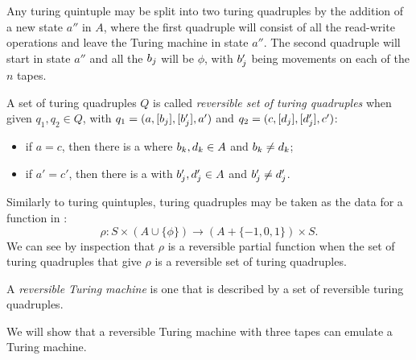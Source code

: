 \begin{remark}\label{rem:quintuple_to_quadruple}
  Any turing quintuple may be split into two
  turing quadruples by the addition of a new state $a''$ in $A$, where the
  first quadruple will consist of all the read-write operations and
  leave the Turing machine in state $a''$. The second quadruple will start
  in state $a''$ and all the $b_j$ will be $\phi$, with $b'_j$ being
  movements on each of the $n$ tapes.
\end{remark}

\begin{definition}\label{def:reversible_turing_quadruple}
  A set of turing quadruples $Q$ is called \emph{reversible set of turing
  quadruples} when given $q_1,q_2\in Q$, with $q_1=(a,[b_j], [b'_j], a')$ and
  $q_2=(c,[d_j], [d'_j], c')$:
\begin{itemize}
  \item[\axiom{RTM}{1}]  if $a=c$, then there is a \kay where $b_k, d_k \in A$ and
    $b_k \ne d_k$;
  \item[\axiom{RTM}{2}] if $a' = c'$, then there is a \jay with $b'_j, d'_j \in A$ and
    $b'_j \ne d'_j$.
\end{itemize}
\end{definition}

Similarly to turing quintuples, turing quadruples may be taken as the
data for a function in \sets:
\[\rho:S\times(A  \cup \{\phi\}) \to (A  + \{-1,0,1\}) \times S.\]
We can see by inspection that $\rho$ is a reversible partial function when
the set of turing quadruples that give $\rho$ is a reversible set of turing
quadruples.

\begin{definition}\label{def:reversible_turing_machine}
  A \emph{reversible Turing machine} is one that is described by a
  set of reversible turing quadruples.
\end{definition}

We will show that a reversible Turing machine with three tapes can emulate
a Turing machine.


